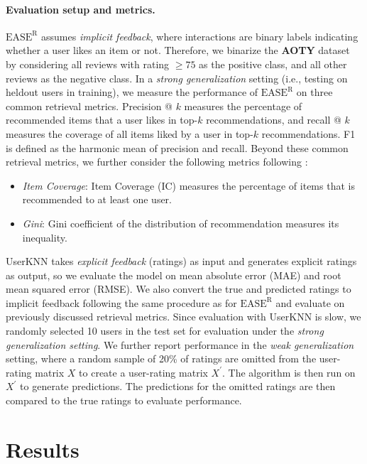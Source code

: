 \documentclass{article}
\newcommand{\aoty}{{\bf AOTY}\xspace}
\newcommand{\easer}{$\text{EASE}^\text{R}$\xspace}
\newcommand{\userknn}{UserKNN\xspace}
\begin{document}
\paragraph*{Evaluation setup and metrics.}
\easer assumes {\em implicit feedback}, where interactions are binary
labels indicating whether a user likes an item or not.
Therefore, we binarize the \aoty dataset by considering all reviews with rating
 $\ge 75$ as the positive class, and all other reviews as the negative class.
In a {\em strong generalization} setting (i.e., testing on heldout users in
 training), we measure the performance of \easer on three common retrieval
 metrics.
Precision @ $k$ measures the percentage of recommended items that a user likes
 in top-$k$ recommendations, and recall @ $k$ measures the coverage of all items
 liked by a user in top-$k$ recommendations.
F1 is defined as the harmonic mean of precision and recall.
Beyond these common retrieval metrics, we further consider the following
 metrics following \citet{anelliTopNRecommendationAlgorithms2022}:
 \begin{itemize} \item {\em Item Coverage}: Item Coverage (IC) measures the
 percentage of items that is recommended to at least one user.
\item {\em Gini}: Gini coefficient of the distribution of recommendation
measures its inequality.
\end{itemize}

\userknn takes {\em explicit feedback} (ratings) as input and generates
explicit ratings as output,
so we evaluate the model on mean absolute error (MAE) and root mean squared
error (RMSE).
We also convert the true and predicted ratings to implicit feedback following
 the same procedure as for \easer and evaluate on previously discussed retrieval
 metrics.
Since evaluation with \userknn is slow, we randomly selected 10 users in the
 test set for evaluation under the {\em strong generalization setting}.
We further report performance in the {\em weak generalization} setting, where a
 random sample of 20\% of ratings are omitted from the user-rating matrix $X$ to
 create a user-rating matrix $X^{\prime}$.
The algorithm is then run on $X^{\prime}$ to generate predictions.
The predictions for the omitted ratings are then compared to the true ratings
 to evaluate performance.

\section{Results}
\end{document}
